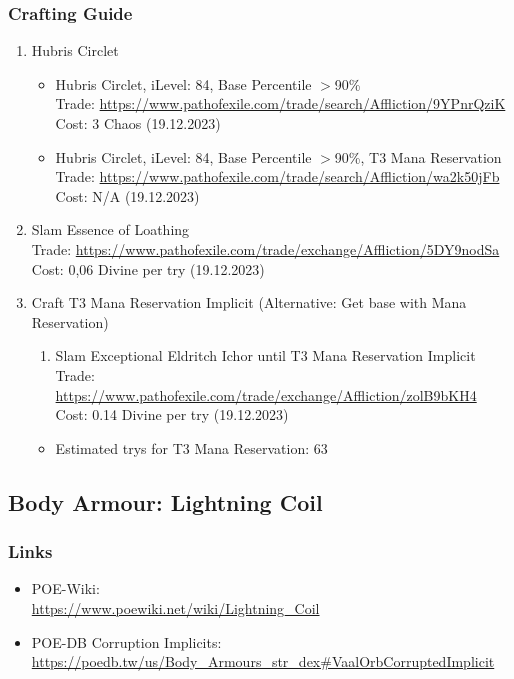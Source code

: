 \subsubsection{Crafting Guide}
\begin{enumerate}
	\item Hubris Circlet
	\begin{itemize}
		\item Hubris Circlet, iLevel: 84, Base Percentile $>$90\%\\
		Trade: \url{https://www.pathofexile.com/trade/search/Affliction/9YPnrQziK}\\
		Cost: 3 Chaos (19.12.2023)
		\item Hubris Circlet, iLevel: 84, Base Percentile $>$90\%, T3 Mana Reservation\\
		Trade: \url{https://www.pathofexile.com/trade/search/Affliction/wa2k50jFb}\\
		Cost: N/A (19.12.2023)
	\end{itemize}
	\item Slam Essence of Loathing\\
		Trade: \url{https://www.pathofexile.com/trade/exchange/Affliction/5DY9nodSa}\\
		Cost: 0,06 Divine per try (19.12.2023)
	\item Craft T3 Mana Reservation Implicit (Alternative: Get base with Mana Reservation)
		\begin{enumerate}
			\item Slam Exceptional Eldritch Ichor until T3 Mana Reservation Implicit\\
				Trade: \url{https://www.pathofexile.com/trade/exchange/Affliction/zolB9bKH4}\\
				Cost: 0.14 Divine per try (19.12.2023)
		\end{enumerate}
		\begin{itemize}
			\item Estimated trys for T3 Mana Reservation: 63
		\end{itemize}
\end{enumerate}

\subsection{Body Armour: Lightning Coil}
\subsubsection{Links}
\begin{itemize}
	\item POE-Wiki:\\
	\url{https://www.poewiki.net/wiki/Lightning_Coil}
	\item POE-DB Corruption Implicits:
	\url{https://poedb.tw/us/Body_Armours_str_dex#VaalOrbCorruptedImplicit}
\end{itemize}

